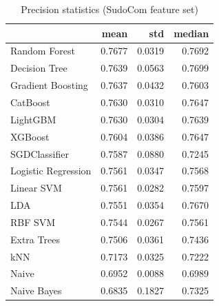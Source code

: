\begin{table}
\caption{Precision statistics (SudoCom feature set)}
\label{tab:precision_SudoCom_stats}
\begin{tabular}{lrrr}
\toprule
 & mean & std & median \\
\midrule
Random Forest & 0.7677 & 0.0319 & 0.7692 \\
Decision Tree & 0.7639 & 0.0563 & 0.7699 \\
Gradient Boosting & 0.7637 & 0.0432 & 0.7603 \\
CatBoost & 0.7630 & 0.0310 & 0.7647 \\
LightGBM & 0.7630 & 0.0304 & 0.7639 \\
XGBoost & 0.7604 & 0.0386 & 0.7647 \\
SGDClassifier & 0.7587 & 0.0880 & 0.7245 \\
Logistic Regression & 0.7561 & 0.0347 & 0.7568 \\
Linear SVM & 0.7561 & 0.0282 & 0.7597 \\
LDA & 0.7551 & 0.0354 & 0.7670 \\
RBF SVM & 0.7544 & 0.0267 & 0.7561 \\
Extra Trees & 0.7506 & 0.0361 & 0.7436 \\
kNN & 0.7173 & 0.0325 & 0.7222 \\
Naive & 0.6952 & 0.0088 & 0.6989 \\
Naive Bayes & 0.6835 & 0.1827 & 0.7325 \\
\bottomrule
\end{tabular}
\end{table}

